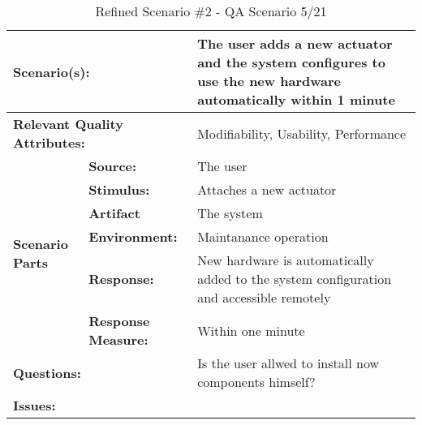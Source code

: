\documentclass[a4paper,10pt]{article}
\begin{document}
\begin{table}[!htp]
\begin{center}
\begin{tabular}{|p{0.3cm}|p{2.5cm}|p{8cm}|}
  \hline
  \multicolumn{2}{|p{3cm}|}{\bfseries Scenario(s):} & The user adds a new actuator and the system configures to use the new hardware automatically within 1 minute \\
  \hline
  \multicolumn{2}{|p{3cm}|}{\bfseries Relevant Quality Attributes:} & Modifiability, Usability, Performance \\
  \hline
  \multirow{6}{*}{\begin{sideways}{\bfseries Scenario Parts}\end{sideways}}
  & {\bfseries Source:} & The user \\
  \cline{2-3}
  & {\bfseries Stimulus:} & Attaches a new actuator \\
  \cline{2-3}
  & {\bfseries Artifact} & The system \\
  \cline{2-3}
  & {\bfseries Environment:} & Maintanance operation \\
  \cline{2-3}
  & {\bfseries Response:} & New hardware is automatically added to the system configuration and accessible remotely \\
  \cline{2-3}
  & {\bfseries Response \mbox{Measure:}} & Within one minute \\
  \hline
  \multicolumn{2}{|p{3cm}|}{\bfseries Questions:} & Is the user allwed to install now components himself? \\
  \hline
  \multicolumn{2}{|p{3cm}|}{\bfseries Issues:} &  \\
  \hline
\end{tabular}
\caption{Refined Scenario \#2 - QA Scenario 5/21}
\end{center}
\end{table}
\end{document}
